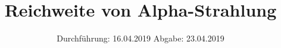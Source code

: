 

\subject{V701}
\title{Reichweite von Alpha-Strahlung}
\date{%
Durchführung: {16.04.2019}
\hspace{3em}
Abgabe: {23.04.2019}
}



\maketitle
\thispagestyle{empty}
\tableofcontents
\newpage





\printbibliography{}

